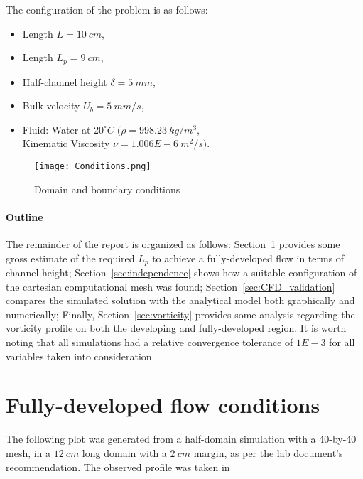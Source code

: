 \documentclass[12pt]{article}
\begin{document}
        The configuration of the problem is as follows:
        \begin{itemize}
                \item Length \( L = 10 \: cm \),
                \item Length \( L_p = 9 \: cm \),
                \item Half-channel height \(\delta = 5 \: mm\),
                \item Bulk velocity \( U_b = 5 \: mm/s \),
                \item Fluid: Water at \( 20^{\circ}C \; ( \rho = 998.23 \: kg/m^3\), \\ Kinematic Viscosity \( \nu = 1.006E-6 \: m^2/s ) \).
        \end{itemize}

        \begin{figure}[!ht]
                \texttt{[image: Conditions.png]}
                \centering
                \caption{Domain and boundary conditions}
                \label{fig:conditions}
        \end{figure}

        \paragraph{Outline}
        The remainder of the report is organized as follows: Section~\ref{sec:developed_flow} provides some gross estimate of the required \( L_p \) to achieve a fully-developed flow in terms of channel height; Section~\ref{sec:independence} shows how a suitable configuration of the cartesian computational mesh was found; Section~\ref{sec:CFD_validation} compares the simulated solution with the analytical model both graphically and numerically; Finally, Section~\ref{sec:vorticity} provides some analysis regarding the vorticity profile on both the developing and fully-developed region. It is worth noting that all simulations had a relative convergence tolerance of $ 1E-3 $ for all variables taken into consideration.

\section{Fully-developed flow conditions} \label{sec:developed_flow}

        The following plot was generated from a half-domain simulation with a 40-by-40 mesh, in a $ 12 \: cm $ long domain with a $ 2 \: cm $ margin, as per the lab document's recommendation. The observed profile was taken in
\end{document}
